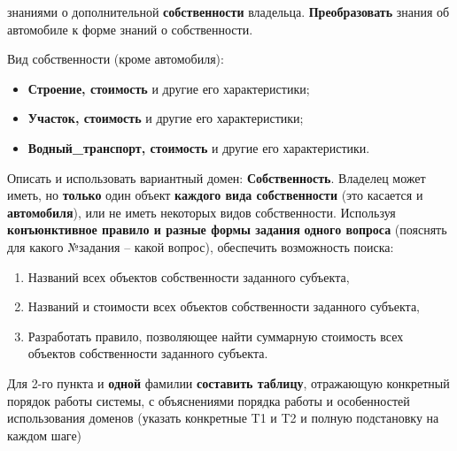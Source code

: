 знаниями о дополнительной \textbf{собственности} владельца. \textbf{Преобразовать} знания об автомобиле к форме знаний о собственности.

Вид собственности (кроме автомобиля):
\begin{itemize}
    \item \textbf{Строение, стоимость} и другие его характеристики;
    \item \textbf{Участок, стоимость} и другие его характеристики;
    \item \textbf{Водный\_транспорт, стоимость} и другие его характеристики.
\end{itemize}

Описать и использовать вариантный домен: \textbf{Собственность}. Владелец может иметь, но \textbf{только} один объект \textbf{каждого вида собственности} (это касается и \textbf{автомобиля}), или не иметь некоторых видов собственности.
Используя \textbf{конъюнктивное правило и разные формы задания} \textbf{одного вопроса} (пояснять для какого №задания – какой вопрос), обеспечить возможность поиска:
\begin{enumerate}
    \item Названий всех объектов собственности заданного субъекта,
    \item Названий и стоимости всех объектов собственности заданного субъекта,
    \item Разработать правило, позволяющее найти суммарную стоимость всех объектов собственности заданного субъекта.
\end{enumerate}
Для 2-го пункта и \textbf{одной} фамилии \textbf{составить таблицу}, отражающую конкретный порядок работы системы, с объяснениями порядка работы и особенностей использования доменов (указать конкретные T1 и T2 и полную подстановку на каждом шаге)

